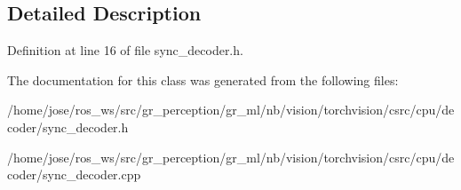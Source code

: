\subsection{Detailed Description}


Definition at line 16 of file sync\+\_\+decoder.\+h.



The documentation for this class was generated from the following files\+:\begin{DoxyCompactItemize}
\item 
/home/jose/ros\+\_\+ws/src/gr\+\_\+perception/gr\+\_\+ml/nb/vision/torchvision/csrc/cpu/decoder/sync\+\_\+decoder.\+h\item 
/home/jose/ros\+\_\+ws/src/gr\+\_\+perception/gr\+\_\+ml/nb/vision/torchvision/csrc/cpu/decoder/sync\+\_\+decoder.\+cpp\end{DoxyCompactItemize}
